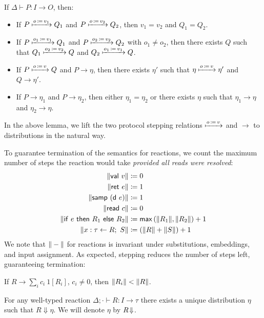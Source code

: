 \begin{lemma}[Confluence]
If $\Delta \vdash P : I \to O$, then:
\begin{itemize}
\item If $P \xmapsto{o \, \coloneqq \, v_1} Q_1$ and $P \xmapsto{o \, \coloneqq \, v_2} Q_2$, then $v_1 = v_2$ and $Q_1 = Q_2$.
\item If $P \xmapsto{o_1 \, \coloneqq \, v_1} Q_1$ and $P \xmapsto{o_2 \, \coloneqq \, v_2} Q_2$ with
$o_1 \neq o_2$, then there exists $Q$ such that $Q_1 \xmapsto{o_2 \, \coloneqq \, v_2} Q$ and $Q_2 \xmapsto{o_1 \, \coloneqq \, v_1} Q$.
\item If $P \xmapsto{o \, \coloneqq \, v} Q$ and $P \to \eta$, then there exists $\eta'$ such that $\eta \xmapsto{o \, \coloneqq \, v} \eta'$ and $Q \to \eta'$.
\item If $P \to \eta_1$ and $P \to \eta_2$, then either $\eta_1 = \eta_2$ or there exists $\eta$ such that $\eta_1 \to \eta$ and $\eta_2 \to \eta$.
\end{itemize}
\end{lemma}

\noindent In the above lemma, we lift the two protocol stepping relations $\xmapsto{o \, \coloneqq \, v}$ and $\to$ to distributions in the natural way. \smallskip

To guarantee termination of the semantics for reactions, we count the maximum number of steps the reaction would take \emph{provided all reads were resolved}:
\begin{align*}
\Vert \mathsf{val} \ v \Vert & \coloneqq 0 \\
\Vert \mathsf{ret} \ e \Vert & \coloneqq 1 \\
\Vert \mathsf{samp} \ (\mathsf{d} \ e) \Vert & \coloneqq 1 \\
\Vert \mathsf{read} \ c \Vert & \coloneqq 0 \\
\Vert \mathsf{if} \ e \ \mathsf{then} \ R_1 \ \mathsf{else} \ R_2 \Vert & \coloneqq \mathsf{max} \, (\Vert R_1 \Vert, \Vert R_2 \Vert) + 1 \\
\Vert x : \tau \leftarrow R; \ S \Vert & \coloneqq (\Vert R \Vert + \Vert S \Vert) + 1
\end{align*}
We note that $\Vert - \Vert$ for reactions is invariant under substitutions, embeddings, and input assignment. As expected, stepping reduces the number of steps left, guaranteeing termination:

\begin{lemma}
If $R \to \sum_i c_i \ 1[R_i]$, $c_i \neq 0$, then $\Vert R_i \Vert < \Vert R \Vert$.
\end{lemma}

\begin{corollary}
For any well-typed reaction $\Delta; \cdot \vdash R : I \to \tau$ there exists a unique distribution $\eta$ such that $R \Downarrow \eta$. We will denote $\eta$  by $R \! \Downarrow$.
\end{corollary}

